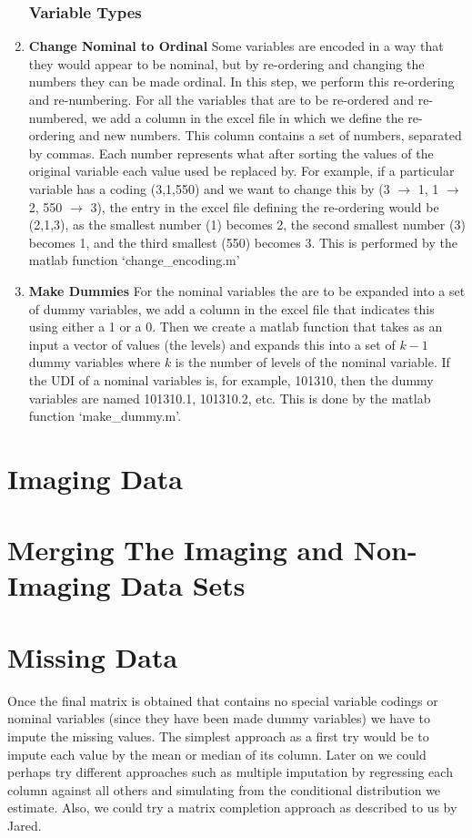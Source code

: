 \documentclass{article}
\begin{document}
\begin{enumerate}
\subsubsection*{Variable Types}
\item {\bf Change Nominal to Ordinal} 
Some variables are encoded in a way that they would appear to be nominal, but by re-ordering and changing the numbers they can be made ordinal. In this step, we perform this re-ordering and re-numbering. For all the variables that are to be re-ordered and re-numbered, we add a column in the excel file in which we define the re-ordering and new numbers. This column contains a set of numbers, separated by commas. Each number represents what after sorting the values of the original variable each value used be replaced by. For example, if a particular variable has a coding (3,1,550) and we want to change this by (3 $\to$ 1, 1 $\to$ 2, 550 $\to$ 3), the entry in the excel file defining the re-ordering would be (2,1,3), as the smallest number (1) becomes 2, the second smallest number (3) becomes 1, and the third smallest (550) becomes 3. This is performed by the matlab function `change\_encoding.m'
\item {\bf Make Dummies}
For the nominal variables the are to be expanded into a set of dummy variables, we add a column in the excel file that indicates this using either a 1 or a 0. Then we create a matlab function that takes as an input a vector of values (the levels) and expands this into a set of $k-1$ dummy variables where $k$ is the number of levels of the nominal variable. If the UDI of a nominal variables is, for example, 101310, then the dummy variables are named 101310.1, 101310.2, etc. This is done by the matlab function `make\_dummy.m'. 
\end{enumerate} 

\section{Imaging Data}

\section{Merging The Imaging and Non-Imaging Data Sets}

\section{Missing Data}
Once the final matrix is obtained that contains no special variable codings or nominal variables (since they have been made dummy variables) we have to impute the missing values. The simplest approach as a first try would be to impute each value by the mean or median of its column. Later on we could perhaps try different approaches such as multiple imputation by regressing each column against all others and simulating from the conditional distribution we estimate. Also, we could try a matrix completion approach as described to us by Jared. 
\end{document}
